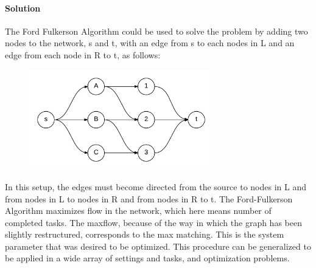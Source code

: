 \documentclass[12pt,letterpaper]{article}
\begin{document}
\paragraph{Solution} The Ford Fulkerson Algorithm could be used to solve the problem by adding two nodes to the network, s and t, with an edge from s to each nodes in L and an edge from each node in R to t, as follows:
\begin{figure}[h]
\centering
\includegraphics[width=8cm]{bipartiteff}
\end{figure}
\FloatBarrier
In this setup, the edges must become directed from the source to nodes in L and from nodes in L to nodes in R and from nodes in R to t. The Ford-Fulkerson Algorithm maximizes flow in the network, which here means number of completed tasks. The maxflow, because of the way in which the graph has been slightly restructured, corresponds to the max matching. This is the system parameter that was desired to be optimized. This procedure can be generalized to be applied in a wide array of settings and tasks, and optimization problems.
\end{document}

